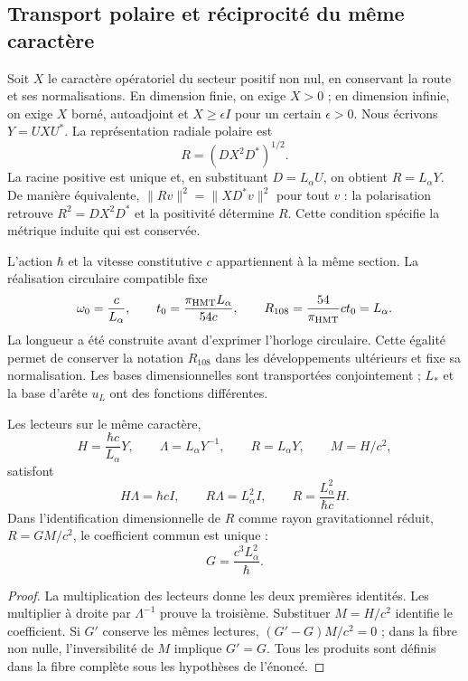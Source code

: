 \subsection{Transport polaire et réciprocité du même caractère}
\label{md:rigidez:polar}

Soit $X$ le caractère opératoriel du secteur positif non nul, en conservant la route et
ses normalisations. En dimension finie, on exige $X>0$ ; en dimension
infinie, on exige $X$ borné, autoadjoint et $X\ge\epsilon I$ pour un certain
$\epsilon>0$. Nous écrivons $Y=UXU^*$. La représentation radiale polaire est
\[
 R=(DX^2D^*)^{1/2}.
\]
La racine positive est unique et, en substituant $D=L_\alpha U$, on obtient
$R=L_\alpha Y$. De manière équivalente,
$\|Rv\|^2=\|XD^*v\|^2$ pour tout $v$ : la polarisation retrouve
$R^2=DX^2D^*$ et la positivité détermine $R$. Cette condition spécifie
la métrique induite qui est conservée.

L’action $\hbar$ et la vitesse constitutive $c$ appartiennent à la même
section. La réalisation circulaire compatible fixe
\begin{equation}
 \omega_0=\frac{c}{L_\alpha},\qquad
 t_0=\frac{\pi_{\rm HMT}L_\alpha}{54c},\qquad
 R_{108}=\frac{54}{\pi_{\rm HMT}}ct_0=L_\alpha.
 \label{md:rigidez:reloj}
\end{equation}
La longueur a été construite avant d’exprimer l’horloge circulaire. Cette
égalité permet de conserver la notation $R_{108}$ dans les développements
ultérieurs et fixe sa normalisation. Les bases dimensionnelles sont transportées
conjointement ; $L_*$ et la base d’arête $u_L$ ont des fonctions différentes.

\begin{theorem}
\label{md:rigidez:teorema}
Les lecteurs sur le même caractère,
\[
 H=\frac{\hbar c}{L_\alpha}Y,\qquad
 \Lambda=L_\alpha Y^{-1},\qquad R=L_\alpha Y,\qquad M=H/c^2,
\]
satisfont
\begin{equation}
 H\Lambda=\hbar cI,\qquad R\Lambda=L_\alpha^2I,\qquad
 R=\frac{L_\alpha^2}{\hbar c}H.
 \label{md:rigidez:identidades}
\end{equation}
Dans l’identification dimensionnelle de $R$ comme rayon gravitationnel réduit,
$R=GM/c^2$, le coefficient commun est unique :
\begin{equation}
 \boxed{G=\frac{c^3L_\alpha^2}{\hbar}.}
 \label{md:rigidez:G}
\end{equation}
\end{theorem}
\begin{proof}
La multiplication des lecteurs donne les deux premières identités.
Les multiplier à droite par $\Lambda^{-1}$ prouve la troisième.
Substituer $M=H/c^2$ identifie le coefficient. Si $G'$ conserve les mêmes
lectures, $(G'-G)M/c^2=0$ ; dans la fibre non nulle, l’inversibilité de $M$
implique $G'=G$.
Tous les produits sont définis dans la fibre complète sous les
hypothèses de l’énoncé.
\end{proof}

